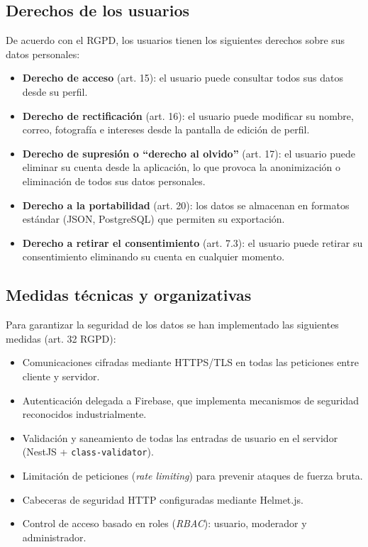 \subsection{Derechos de los usuarios}

De acuerdo con el RGPD, los usuarios tienen los siguientes derechos sobre sus datos personales:

\begin{itemize}
    \item \textbf{Derecho de acceso} (art. 15): el usuario puede consultar todos sus datos desde su perfil.
    \item \textbf{Derecho de rectificación} (art. 16): el usuario puede modificar su nombre, correo, fotografía e intereses desde la pantalla de edición de perfil.
    \item \textbf{Derecho de supresión o ``derecho al olvido''} (art. 17): el usuario puede eliminar su cuenta desde la aplicación, lo que provoca la anonimización o eliminación de todos sus datos personales.
    \item \textbf{Derecho a la portabilidad} (art. 20): los datos se almacenan en formatos estándar (JSON, PostgreSQL) que permiten su exportación.
    \item \textbf{Derecho a retirar el consentimiento} (art. 7.3): el usuario puede retirar su consentimiento eliminando su cuenta en cualquier momento.
\end{itemize}

\subsection{Medidas técnicas y organizativas}

Para garantizar la seguridad de los datos se han implementado las siguientes medidas (art. 32 RGPD):

\begin{itemize}
    \item Comunicaciones cifradas mediante HTTPS/TLS en todas las peticiones entre cliente y servidor.
    \item Autenticación delegada a Firebase, que implementa mecanismos de seguridad reconocidos industrialmente.
    \item Validación y saneamiento de todas las entradas de usuario en el servidor (NestJS + \texttt{class-validator}).
    \item Limitación de peticiones (\textit{rate limiting}) para prevenir ataques de fuerza bruta.
    \item Cabeceras de seguridad HTTP configuradas mediante Helmet.js.
    \item Control de acceso basado en roles (\textit{RBAC}): usuario, moderador y administrador.
\end{itemize}


